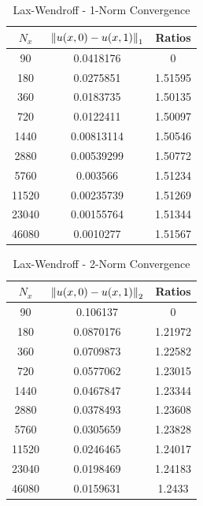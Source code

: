 \documentclass[12pt]{article}
\begin{document}
\begin{minipage}{0.5\textwidth}
\begin{table}[H]
\caption{Lax-Wendroff - 1-Norm Convergence}
\centering\begin{tabular}{||c|cc||}
\hline \hline
    $N_x$ & $\norm{u(x,0)-u(x,1)}_1$ &  Ratios \\
\hline
    90 &     0.0418176  &  0       \\
   180 &     0.0275851  &  1.51595 \\
   360 &     0.0183735  &  1.50135 \\
   720 &     0.0122411  &  1.50097 \\
  1440 &     0.00813114 &  1.50546 \\
  2880 &     0.00539299 &  1.50772 \\
  5760 &     0.003566   &  1.51234 \\
 11520 &     0.00235739 &  1.51269 \\
 23040 &     0.00155764 &  1.51344 \\
 46080 &     0.0010277  &  1.51567 \\
\hline
\end{tabular}\end{table}
\end{minipage}
\begin{minipage}{0.5\textwidth}
\begin{table}[H]
\caption{Lax-Wendroff - 2-Norm Convergence}
\centering\begin{tabular}{||c|cc||}
\hline \hline
$N_x$  & $\norm{u(x,0)-u(x,1)}_2$ &  Ratios \\
\hline
    90 &      0.106137  &  0       \\
   180 &      0.0870176 &  1.21972 \\
   360 &      0.0709873 &  1.22582 \\
   720 &      0.0577062 &  1.23015 \\
  1440 &      0.0467847 &  1.23344 \\
  2880 &      0.0378493 &  1.23608 \\
  5760 &      0.0305659 &  1.23828 \\
 11520 &      0.0246465 &  1.24017 \\
 23040 &      0.0198469 &  1.24183 \\
 46080 &      0.0159631 &  1.2433  \\
\hline
\end{tabular}\end{table}\end{minipage}
\end{document}
